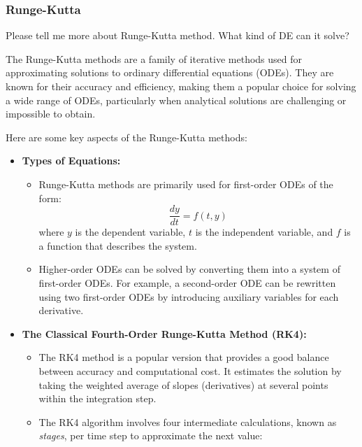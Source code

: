 \subsubsection{Runge-Kutta}

\begin{ai}
Please tell me more about Runge-Kutta method. What kind of DE can it solve?
\end{ai}

\begin{airesult}
The Runge-Kutta methods are a family of iterative methods used for approximating solutions to
ordinary differential equations (ODEs). They are known for their accuracy and efficiency, making
them a popular choice for solving a wide range of ODEs, particularly when analytical solutions are
challenging or impossible to obtain.

\vsp

Here are some key aspects of the Runge-Kutta methods:

\begin{itemize}
\item \textbf{Types of Equations:}

  \begin{itemize}
  \item Runge-Kutta methods are primarily used for first-order ODEs of the form:
  \[
  \frac{dy}{dt} = f(t, y)
  \]
  where \(y\) is the dependent variable, \(t\) is the independent variable, and \(f\) is a function
that describes the system.

  \item Higher-order ODEs can be solved by converting them into a system of first-order ODEs. For
example, a second-order ODE can be rewritten using two first-order ODEs by introducing auxiliary
variables for each derivative.

  \end{itemize}

\item \textbf{The Classical Fourth-Order Runge-Kutta Method (RK4):}

  \begin{itemize}
  \item The RK4 method is a popular version that provides a good balance between accuracy and
computational cost. It estimates the solution by taking the weighted average of slopes (derivatives)
at several points within the integration step.

  \item The RK4 algorithm involves four intermediate calculations, known as \textit{stages}, per
time step to approximate the next value:


\end{itemize}
\end{itemize}
\end{airesult}
